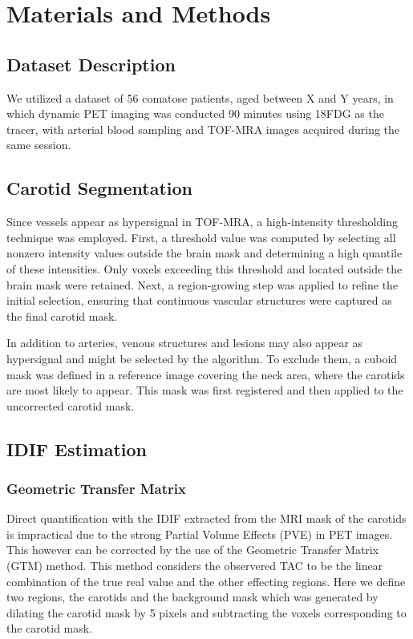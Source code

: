 \chapter{Materials and Methods}

\section{Dataset Description}
We utilized a dataset of 56 comatose patients, aged between  X and Y years, in which dynamic PET imaging was conducted 90 minutes using 18FDG as the tracer, with arterial blood sampling and TOF-MRA images acquired during the same session.
\section{Carotid Segmentation}
Since vessels appear as hypersignal in TOF-MRA, a high-intensity thresholding technique was employed.
First, a threshold value was computed by selecting all nonzero intensity values outside the brain mask and determining a high quantile of these intensities.
Only voxels exceeding this threshold and located outside the brain mask were retained.
Next, a region-growing step was applied to refine the initial selection, ensuring that continuous vascular structures were captured as the final carotid mask.

In addition to arteries, venous structures and lesions may also appear as hypersignal and might be selected by the algorithm.
To exclude them, a cuboid mask was defined in a reference image covering the neck area, where the carotids are most likely to appear.
This mask was first registered and then applied to the uncorrected carotid mask.
\section{IDIF Estimation}
\subsection{Geometric Transfer Matrix}
Direct quantification with the IDIF extracted from the MRI mask of the carotids is impractical due to the strong Partial Volume Effects (PVE) in PET images. %
This however can be corrected by the use of the Geometric Transfer Matrix (GTM) method. This method considers the observered TAC to be the linear combination of the true real value and the other effecting regions.
Here we define two regions, the carotids and the background mask which was generated by dilating the carotid mask by 5 pixels and subtracting the voxels corresponding to the carotid mask.

